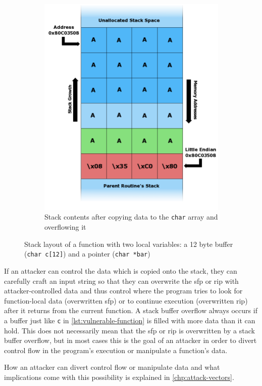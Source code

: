 \begin{figure}[htb]
\begin{subfigure}[t]{0.3\textwidth}
		\includegraphics[height=0.25\textheight]{figures/Stack_Overflow_4}
		\caption{Stack contents after copying data to the \texttt{char} array and overflowing it \cite{Lynn2007b}}
		\label{fig:stack-layout-overflow}
	\end{subfigure}
	\caption{Stack layout of a function with two local variables: a 12 byte buffer (\texttt{char c[12]}) and a pointer (\texttt{char *bar})}
	\label{fig:stack-layout}
\end{figure}

If an attacker can control the data which is copied onto the stack, they can carefully craft an input string so that they can overwrite the \gls{sfp} or \gls{rip} with attacker-controlled data and thus control where the program tries to look for function-local data (overwritten \gls{sfp}) or to continue execution (overwritten \gls{rip}) after it returns from the current function.
A stack buffer overflow always occurs if a buffer just like \texttt{c} in \cref{lst:vulnerable-function} is filled with more data than it can hold.
This does not necessarily mean that the \gls{sfp} or \gls{rip} is overwritten by a stack buffer overflow, but in most cases this is the goal of an attacker in order to divert control flow in the program's execution or manipulate a function's data.

How an attacker can divert control flow or manipulate data and what implications come with this possibility is explained in \cref{chp:attack-vectors}.

